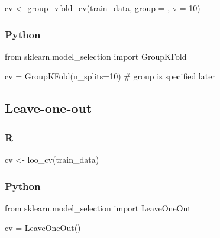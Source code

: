 \documentclass[
  letterpaper,
  DIV=11,
  numbers=noendperiod]{scrreprt}
\newenvironment{Shaded}{\begin{snugshade}}{\end{snugshade}}
\newcommand{\AttributeTok}[1]{\textcolor[rgb]{0.40,0.46,0.14}{#1}}
\newcommand{\CommentTok}[1]{\textcolor[rgb]{0.37,0.37,0.37}{#1}}
\newcommand{\DecValTok}[1]{\textcolor[rgb]{0.68,0.00,0.00}{#1}}
\newcommand{\FunctionTok}[1]{\textcolor[rgb]{0.28,0.35,0.67}{#1}}
\newcommand{\ImportTok}[1]{\textcolor[rgb]{0.00,0.46,0.62}{#1}}
\newcommand{\NormalTok}[1]{\textcolor[rgb]{0.00,0.46,0.62}{#1}}
\newcommand{\OperatorTok}[1]{\textcolor[rgb]{0.37,0.37,0.37}{#1}}
\newcommand{\OtherTok}[1]{\textcolor[rgb]{0.00,0.46,0.62}{#1}}
\begin{document}
\begin{Shaded}
\begin{Highlighting}[]
\NormalTok{cv }\OtherTok{\textless{}{-}} \FunctionTok{group\_vfold\_cv}\NormalTok{(train\_data, }\AttributeTok{group =}\NormalTok{ , }\AttributeTok{v =} \DecValTok{10}\NormalTok{)}
\end{Highlighting}
\end{Shaded}

\hypertarget{python-56}{%
\subsubsection{Python}\label{python-56}}

\begin{Shaded}
\begin{Highlighting}[]
\ImportTok{from}\NormalTok{ sklearn.model\_selection }\ImportTok{import}\NormalTok{ GroupKFold}

\NormalTok{cv }\OperatorTok{=}\NormalTok{ GroupKFold(n\_splits}\OperatorTok{=}\DecValTok{10}\NormalTok{)}
\CommentTok{\# group is specified later}
\end{Highlighting}
\end{Shaded}

\hypertarget{leave-one-out}{%
\subsection{Leave-one-out}\label{leave-one-out}}

\hypertarget{r-57}{%
\subsubsection{R}\label{r-57}}

\begin{Shaded}
\begin{Highlighting}[]
\NormalTok{cv }\OtherTok{\textless{}{-}} \FunctionTok{loo\_cv}\NormalTok{(train\_data)}
\end{Highlighting}
\end{Shaded}

\hypertarget{python-57}{%
\subsubsection{Python}\label{python-57}}

\begin{Shaded}
\begin{Highlighting}[]
\ImportTok{from}\NormalTok{ sklearn.model\_selection }\ImportTok{import}\NormalTok{ LeaveOneOut}

\NormalTok{cv }\OperatorTok{=}\NormalTok{ LeaveOneOut()}
\end{Highlighting}
\end{Shaded}
\end{document}
